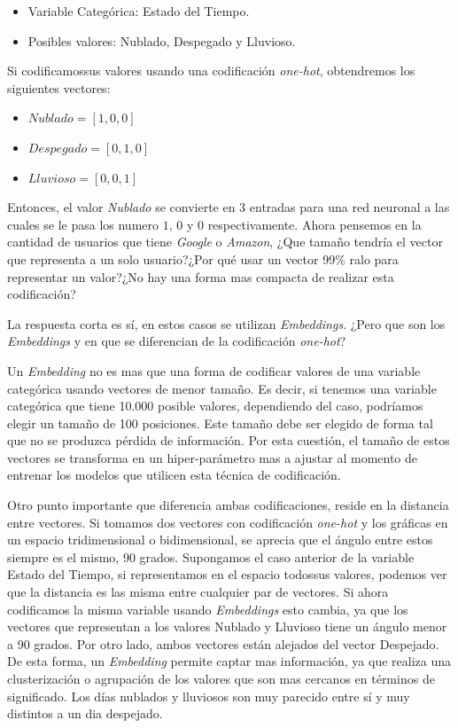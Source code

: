 \documentclass[11pt,a4paper,twoside]{thesis}
\begin{document}
\begin{itemize}
	\item Variable Categórica: Estado del Tiempo.
	\item Posibles valores: Nublado, Despegado y Lluvioso.
\end{itemize}

Si codificamossus valores usando una codificación \textit{one-hot}, obtendremos
los siguientes vectores:

\begin{itemize}
	\item $Nublado    = [1, 0, 0]$
	\item $Despegado  = [0, 1, 0]$
	\item $Lluvioso   = [0, 0, 1]$
\end{itemize}

Entonces, el valor \textit{Nublado} se convierte en 3 entradas para una red
neuronal a las cuales se le pasa los numero $1$, $0$ y $0$ respectivamente.
Ahora pensemos en la cantidad de usuarios que tiene \textit{Google} o
\textit{Amazon}, ¿Que tamaño tendría el vector que representa a un solo
usuario?¿Por qué usar un vector 99\% ralo para representar un valor?¿No hay una
forma mas compacta de realizar esta codificación?

La respuesta corta es sí, en estos casos se utilizan \textit{Embeddings}. ¿Pero
que son los \textit{Embeddings} y en que se diferencian de la codificación
\textit{one-hot}?

Un \textit{Embedding} no es mas que una forma de codificar valores de una
variable categórica usando vectores de menor tamaño. Es decir, si tenemos una
variable categórica que tiene 10.000 posible valores, dependiendo del caso,
podríamos elegir un tamaño de 100 posiciones. Este tamaño debe ser elegido de
forma tal que no se produzca pérdida de información. Por esta cuestión, el
tamaño de estos vectores se transforma en un hiper-parámetro mas a ajustar al
momento de entrenar los modelos que utilicen esta técnica de codificación.

Otro punto importante que diferencia ambas codificaciones, reside en la
distancia entre vectores. Si tomamos dos vectores con codificación
\textit{one-hot} y los gráficas en un espacio tridimensional o bidimensional,
se aprecia que el ángulo entre estos siempre es el mismo, 90 grados. Supongamos
el caso anterior de la variable Estado del Tiempo, si representamos en el
espacio todossus valores, podemos ver que la distancia es las misma entre
cualquier par de vectores. Si ahora codificamos la misma variable usando
\textit{Embeddings} esto cambia, ya que los vectores que representan a los
valores Nublado y Lluvioso tiene un ángulo menor a 90 grados. Por otro lado,
ambos vectores están alejados del vector Despejado. De esta forma, un
\textit{Embedding} permite captar mas información, ya que realiza una
clusterización o agrupación de los valores que son mas cercanos en términos de
significado. Los días nublados y lluviosos son muy parecido entre sí y muy
distintos a un dia despejado.
\end{document}
